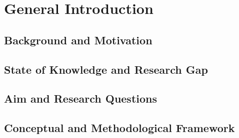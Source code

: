 \chapter{General Introduction}
\label{ch:introduction}


\section{Background and Motivation}
\label{sec:introduction-background}


\section{State of Knowledge and Research Gap}
\label{sec:introduction-gap}


\section{Aim and Research Questions}
\label{sec:introduction-aims}


\section{Conceptual and Methodological Framework}
\label{sec:introduction-framework}

